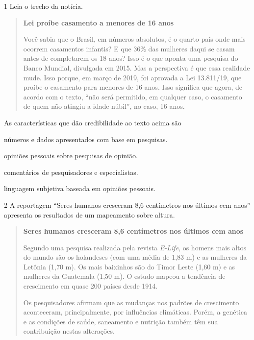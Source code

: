 

\num{1} Leia o trecho da notícia.

\begin{quote}
\textbf{Lei proíbe casamento a menores de 16 anos}

Você sabia que o Brasil, em números absolutos, é o quarto país onde mais
ocorrem casamentos infantis? E que 36\% das mulheres daqui se casam
antes de completarem os 18 anos? Isso é o que aponta uma pesquisa do
Banco Mundial, divulgada em 2015. Mas a perspectiva é que essa realidade
mude. Isso porque, em março de 2019, foi aprovada a Lei 13.811/19, que
proíbe o casamento para menores de 16 anos. Isso significa que agora, de
acordo com o texto, ``não será permitido, em qualquer caso, o casamento
de quem não atingiu a idade núbil'', no caso, 16 anos.

\end{quote}

As características que dão credibilidade ao texto acima são

\begin{escolha}
\item números e dados apresentados com base em pesquisas.

\item opiniões pessoais sobre pesquisas de opinião.

\item comentários de pesquisadores e especialistas.

\item linguagem subjetiva baseada em opiniões pessoais.
\end{escolha}



\num{2} A reportagem ``Seres humanos cresceram 8,6 centímetros nos últimos cem
anos'' apresenta os resultados de um mapeamento sobre altura.

\begin{quote}
\textbf{Seres humanos cresceram 8,6 centímetros nos últimos cem anos}

Segundo uma pesquisa realizada pela revista \textit{E-Life}, os homens
mais altos do mundo são os holandeses (com uma média de 1,83 m) e as
mulheres da Letônia (1,70 m). Os mais baixinhos são do Timor Leste (1,60 m)
e as mulheres da Guatemala (1,50 m). O estudo mapeou a tendência de
crescimento em quase 200 países desde 1914.

Os pesquisadores afirmam que as mudanças nos padrões de crescimento
aconteceram, principalmente, por influências climáticas. Porém, a 
genética e as condições de saúde, saneamento e nutrição também têm sua
contribuição nestas alterações.

\end{quote}

